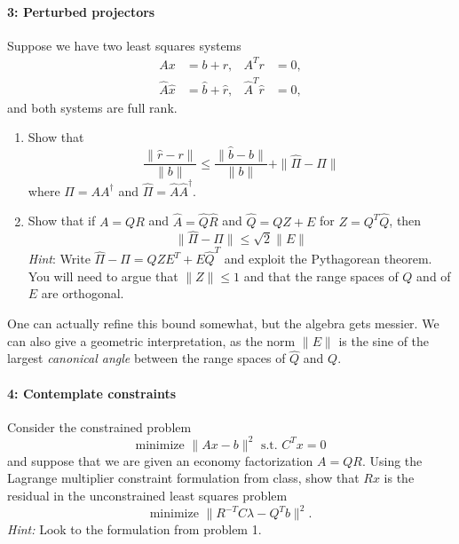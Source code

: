 \documentclass[12pt, leqno]{article} %
\begin{document}
\paragraph*{3: Perturbed projectors}
Suppose we have two least squares systems
\begin{align*}
  A x &= b + r, & A^T r &= 0, \\
  \hat{A} \hat{x} &= \hat{b} + \hat{r}, & \hat{A}^T \hat{r} &= 0,
\end{align*}
and both systems are full rank.
\begin{enumerate}
\item
  Show that
  \[
    \frac{\|\hat{r}-r\|}{\|b\|} \leq \frac{\|\hat{b}-b\|}{\|b\|}  + \|\hat{\Pi}-\Pi\|
  \]
  where $\Pi = AA^\dagger$ and $\hat{\Pi} = \hat{A} \hat{A}^\dagger$.
\item
  Show that if $A = QR$ and $\hat{A} = \hat{Q} \hat{R}$ and
  $\hat{Q} = QZ + E$ for $Z = Q^T \hat{Q}$, then
  \[
    \|\hat{\Pi}-\Pi\| \leq \sqrt{2} \|E\|
  \]
  {\em Hint}: Write $\hat{\Pi}-\Pi = QZE^T + E \hat{Q}^T$ and exploit
  the Pythagorean theorem.  You will need to argue that $\|Z\| \leq 1$
  and that the range spaces of $Q$ and of $E$ are orthogonal.
\end{enumerate}
One can actually refine this bound somewhat, but the algebra gets
messier.  We can also give a geometric interpretation, as
the norm $\|E\|$ is the sine of the largest {\em canonical
angle} between the range spaces of $\hat{Q}$ and $Q$.

\paragraph*{4: Contemplate constraints}
Consider the constrained problem
\[
  \mbox{minimize } \|Ax-b\|^2 \mbox{ s.t. } C^T x = 0
\]
and suppose that we are given an economy factorization $A = QR$.
Using the Lagrange multiplier constraint formulation from class,
show that $Rx$ is the residual in the unconstrained least squares
problem
\[
  \mbox{minimize } \|R^{-T} C \lambda - Q^T b\|^2.
\]
{\em Hint:} Look to the formulation from problem 1.
\end{document}

